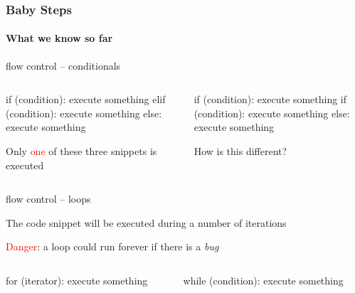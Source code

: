 \documentclass{beamer}
\newcommand{\red}[1]{\textcolor{red}{#1}}
\begin{document}
\begin{frame}[fragile]
\frametitle{Baby Steps}
\framesubtitle{What we know so far}

\alert{flow control -- conditionals}

\begin{columns}
\begin{column}{0.4\textwidth}
\begin{python}
if (condition):
	execute something
elif (condition): 
	execute something
else: 
	execute something
\end{python}

Only \red{one} of these three snippets is executed

\end{column}				\pause 

\begin{column}{0.4\textwidth}

\begin{python}
if (condition):
 	execute something
if (condition): 
 	execute something
else: 
 	execute something
\end{python}
\alert{How is this different?}
\bigskip\medskip
\end{column}
\end{columns}			\pause 
\bigskip

\alert{flow control -- loops}

The code snippet will be executed during a number of iterations

\red{Danger}: a loop could run forever if there is a \textit{bug}

\begin{columns}
\begin{column}{0.4\textwidth}
\begin{python}
for (iterator):
	execute something
\end{python}
\end{column}

\begin{column}{0.4\textwidth}
\begin{python}
while (condition):
	execute something
\end{python}
\end{column}
\end{columns}


\end{frame}
\end{document}

